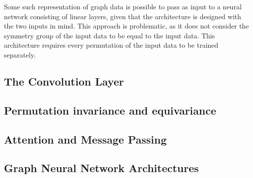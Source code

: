Some such representation of graph data is possible to pass as input to a neural network consisting
of linear layers, given that the architecture is designed with the two inputs in mind.
This approach is problematic, as it does not consider the symmetry group of the input data
to be equal to the input data. This architecture requires every permutation of the input data to be trained separately.






\subsection{The Convolution Layer}




\subsection{Permutation invariance and equivariance}






\subsection{Attention and Message Passing}
\subsection{Graph Neural Network Architectures}

